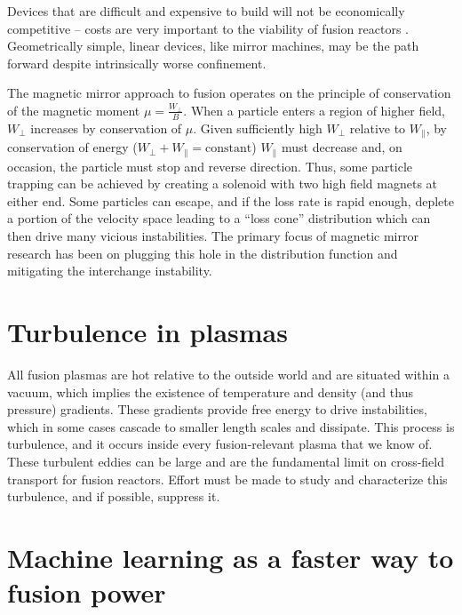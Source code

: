 Devices that are difficult and expensive to build will not be economically competitive -- costs are very important to the viability of fusion reactors \cite{schwartz_value_2023}. Geometrically simple, linear devices, like mirror machines, may be the path forward despite intrinsically worse confinement. 

The magnetic mirror approach to fusion \cite{Post_1987} operates on the principle of conservation of the magnetic moment $\mu = \frac{W_\perp}{B}$. When a particle enters a region of higher field, $W_\perp$ increases by conservation of $\mu$. Given sufficiently high $W_\perp$ relative to $W_\parallel$, by conservation of energy ($W_\perp + W_\parallel = \text{constant}$) $W_\parallel$ must decrease and, on occasion, the particle must stop and reverse direction. Thus, some particle trapping can be achieved by creating a solenoid with two high field magnets at either end. Some particles can escape, and if the loss rate is rapid enough, deplete a portion of the velocity space leading to a ``loss cone'' distribution which can then drive many vicious instabilities. The primary focus of magnetic mirror research has been on plugging this hole in the distribution function and mitigating the interchange instability.

\section{Turbulence in plasmas}

All fusion plasmas are hot relative to the outside world and are situated within a vacuum, which implies the existence of temperature and density (and thus pressure) gradients. These gradients provide free energy to drive instabilities, which in some cases cascade to smaller length scales and dissipate. This process is turbulence, and it occurs inside every fusion-relevant plasma that we know of. These turbulent eddies can be large and are the fundamental limit on cross-field transport for fusion reactors. Effort must be made to study and characterize this turbulence, and if possible, suppress it. 

\section{Machine learning as a faster way to fusion power}

